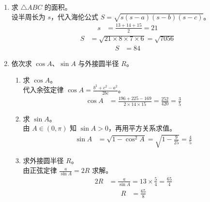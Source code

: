 \documentclass[12pt,a4paper]{exam-zh}
\begin{document}
\begin{solution}
    \begin{enumerate}[label=(\alph*)]
        \item 求 $\triangle ABC$ 的面积。 \\
        设半周长为 $s$，代入海伦公式 $S=\sqrt{s(s-a)(s-b)(s-c)}$。 \\
        \begin{align*}
            s &= \frac{13+14+15}{2} = 21
        \end{align*}
        \begin{align*}
            S &= \sqrt{21\times 8\times 7\times 6} = \sqrt{7056}
        \end{align*}
        \begin{align*}
            S &= 84
        \end{align*}

        \item 依次求 $\cos A$、$\sin A$ 与外接圆半径 $R$。
        \begin{enumerate}[label=(\roman*)]
            \item 求 $\cos A$。 \\
            代入余弦定律 $\cos A=\frac{b^2+c^2-a^2}{2bc}$。 \\
            \begin{align*}
                \cos A &= \frac{196+225-169}{2\times14\times15} = \frac{252}{420} = \frac{3}{5}
            \end{align*}

            \item 求 $\sin A$。 \\
            由 $A\in(0,\pi)$ 知 $\sin A>0$，再用平方关系求值。 \\
            \begin{align*}
                \sin A &= \sqrt{1-\cos^2A} = \sqrt{1-\frac{9}{25}} = \frac{4}{5}
            \end{align*}

            \item 求外接圆半径 $R$。 \\
            由正弦定律 $\frac{a}{\sin A}=2R$ 求解。 \\
            \begin{align*}
                2R &= \frac{a}{\sin A} = 13\times\frac{5}{4} = \frac{65}{4}
            \end{align*}
            \begin{align*}
                R &= \frac{65}{8}
            \end{align*}
        \end{enumerate}
    \end{enumerate}
\end{solution}
\end{document}
